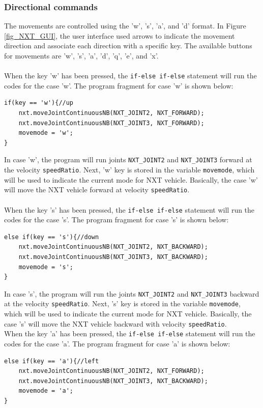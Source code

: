 \documentclass[11pt]{article}
\begin{document}
\subsubsection*{Directional commands}
The movements are controlled using the 'w', 's', 'a', and 'd' format. In Figure \ref{fig_NXT_GUI}, 
the user interface used arrows to indicate the movement direction and associate each direction with 
a specific key. The available buttons for movements are 'w', 's', 'a', 'd', 'q', 'e', and 'x'.
\\ \\
\noindent
When the key 'w' has been pressed, the \verb+if-else if-else+ statement will run the codes for the case 'w'.
The program fragment for case 'w' is shown below:
\begin{verbatim} 
if(key == 'w'){//up
    nxt.moveJointContinuousNB(NXT_JOINT2, NXT_FORWARD);
    nxt.moveJointContinuousNB(NXT_JOINT3, NXT_FORWARD);
    movemode = 'w';
}
\end{verbatim}
In case 'w', the program will run joints \verb+NXT_JOINT2+ and \verb+NXT_JOINT3+ forward at
the velocity \verb+speedRatio+. Next, 'w' key is stored in the variable \verb+movemode+, which will 
be used to indicate the current mode for NXT vehicle. Basically, the case 'w' will move the 
NXT vehicle forward at velocity \verb+speedRatio+.
\\ \\
\noindent
When the key 's' has been pressed, the \verb+if-else if-else+ statement will run the codes 
for the case 's'. The program fragment for case 's' is shown below:
\begin{verbatim} 
else if(key == 's'){//down
    nxt.moveJointContinuousNB(NXT_JOINT2, NXT_BACKWARD);
    nxt.moveJointContinuousNB(NXT_JOINT3, NXT_BACKWARD);
    movemode = 's';
}
\end{verbatim}
In case 's', the program will run the joints \verb+NXT_JOINT2+ and \verb+NXT_JOINT3+ backward 
at the velocity \verb+speedRatio+. Next, 's' key is stored in the variable \verb+movemode+, 
which will be used to indicate the current mode for NXT vehicle. Basically, the case 's' will 
move the NXT vehicle backward with velocity \verb+speedRatio+.\\ 
\newline
\noindent 
When the key 'a' has been pressed, the \verb+if-else if-else+ statement will run the codes for the case 'a'.
The program fragment for case 'a' is shown below:
\begin{verbatim} 
else if(key == 'a'){//left
    nxt.moveJointContinuousNB(NXT_JOINT2, NXT_FORWARD);
    nxt.moveJointContinuousNB(NXT_JOINT3, NXT_BACKWARD);
    movemode = 'a';
}
\end{verbatim}
\end{document}
